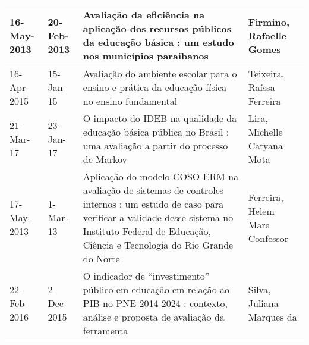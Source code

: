 \begin{table}
{\begin{tabular}{|m{1.3cm}|m{1.3cm}|p{7cm}|p{6cm}|}
16-May-2013 & 20-Feb-2013 & Avaliação da eficiência na aplicação dos recursos públicos da educação básica : um estudo nos municípios paraibanos                                                                                                   & Firmino, Rafaelle Gomes                                                                                                                                                                                                                                      \\ \hline
16-Apr-2015 & 15-Jan-15   & Avaliação do ambiente escolar para o ensino e prática da educação física no ensino fundamental                                                                                                                        & Teixeira, Raíssa Ferreira                                                                                                                                                                                                                                    \\ \hline
21-Mar-17   & 23-Jan-17   & O impacto do IDEB na qualidade da educação básica pública no Brasil : uma avaliação a partir do processo de Markov                                                                                                    & Lira, Michelle Catyana Mota                                                                                                                                                                                                                                  \\ \hline
17-May-2013 & 1-Mar-13    & Aplicação do modelo COSO ERM na avaliação de sistemas de controles internos : um estudo de caso para verificar a validade desse sistema no Instituto Federal de Educação, Ciência e Tecnologia do Rio Grande do Norte & Ferreira, Helem Mara Confessor                                                                                                                                                                                                                               \\ \hline
22-Feb-2016 & 2-Dec-2015  & O indicador de “investimento” público em educação em relação ao PIB no PNE 2014-2024 : contexto, análise e proposta de avaliação da ferramenta                                                                        & Silva, Juliana Marques da                                                                                                                                                                                                                                    \\ \hline

\end{tabular}}
\end{table}
